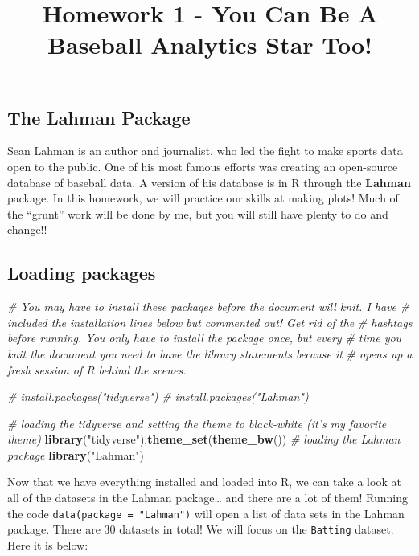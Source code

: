 \documentclass[
]{article}
\title{Homework 1 - You Can Be A Baseball Analytics Star Too!}
\author{}
\date{\vspace{-2.5em}}
\newenvironment{Shaded}{\begin{snugshade}}{\end{snugshade}}
\newcommand{\CommentTok}[1]{\textcolor[rgb]{0.56,0.35,0.01}{\textit{#1}}}
\newcommand{\KeywordTok}[1]{\textcolor[rgb]{0.13,0.29,0.53}{\textbf{#1}}}
\newcommand{\NormalTok}[1]{#1}
\newcommand{\StringTok}[1]{\textcolor[rgb]{0.31,0.60,0.02}{#1}}
\begin{document}
\maketitle

\hypertarget{the-lahman-package}{%
\subsection{The Lahman Package}\label{the-lahman-package}}

Sean Lahman is an author and journalist, who led the fight to make
sports data open to the public. One of his most famous efforts was
creating an open-source database of baseball data. A version of his
database is in R through the \textbf{Lahman} package. In this homework,
we will practice our skills at making plots! Much of the ``grunt'' work
will be done by me, but you will still have plenty to do and change!!

\hypertarget{loading-packages}{%
\subsection{Loading packages}\label{loading-packages}}

\begin{Shaded}
\begin{Highlighting}[]
\CommentTok{# You may have to install these packages before the document will knit. I have}
\CommentTok{# included the installation lines below but commented out! Get rid of the}
\CommentTok{# hashtags before running. You only have to install the package once, but every}
\CommentTok{# time you knit the document you need to have the library statements because it}
\CommentTok{# opens up a fresh session of R behind the scenes.}

\CommentTok{# install.packages("tidyverse")}
\CommentTok{# install.packages("Lahman")}

\CommentTok{# loading the tidyverse and setting the theme to black-white (it's my favorite theme)}
\KeywordTok{library}\NormalTok{(}\StringTok{"tidyverse"}\NormalTok{);}\KeywordTok{theme_set}\NormalTok{(}\KeywordTok{theme_bw}\NormalTok{())}
\CommentTok{# loading the Lahman package}
\KeywordTok{library}\NormalTok{(}\StringTok{"Lahman"}\NormalTok{)}
\end{Highlighting}
\end{Shaded}

Now that we have everything installed and loaded into R, we can take a
look at all of the datasets in the Lahman package\ldots{} and there are
a lot of them! Running the code \texttt{data(package\ =\ "Lahman")} will
open a list of data sets in the Lahman package. There are 30 datasets in
total! We will focus on the \texttt{Batting} dataset. Here it is below:
\end{document}
